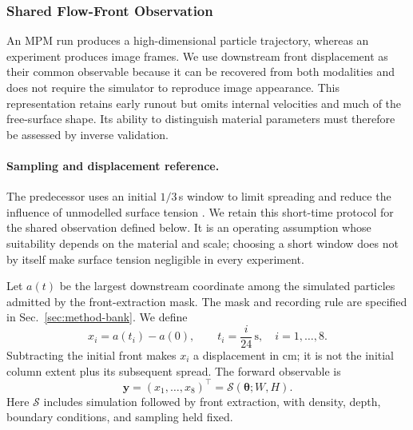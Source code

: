 \subsubsection{Shared Flow-Front Observation}
\label{sec:shared-observation}

An MPM run produces a high-dimensional particle trajectory, whereas an
experiment produces image frames. We use downstream front displacement
as their common observable because it can be recovered from both
modalities and does not require the simulator to reproduce image
appearance. This representation retains early runout but omits internal
velocities and much of the free-surface shape. Its ability to distinguish
material parameters must therefore be assessed by inverse validation.

\paragraph{Sampling and displacement reference.}
The predecessor uses an initial $1/3$\,s window to limit spreading
and reduce the influence of unmodelled surface tension
\cite[Sec.~7.2]{hamamichi2023nonnewtonian}. We retain this short-time
protocol for the shared observation defined below. It is an operating
assumption whose suitability depends on
the material and scale; choosing a short window does not by itself
make surface tension negligible in every experiment.

Let $a(t)$ be the largest downstream coordinate among the simulated
particles admitted by the front-extraction mask. The mask and recording
rule are specified in Sec.~\ref{sec:method-bank}. We define
\begin{equation}
\label{eq:front-displacement}
    x_i=a(t_i)-a(0),\qquad
    t_i=\frac{i}{24}\,\mathrm{s},\quad i=1,\ldots,8.
\end{equation}
Subtracting the initial front makes $x_i$ a displacement in cm; it is
not the initial column extent plus its subsequent spread. The forward
observable is
\begin{equation}
\label{eq:y-def}
    \mathbf y=(x_1,\ldots,x_8)^\top
    =\mathcal S(\boldsymbol\theta;W,H).
\end{equation}
Here $\mathcal S$ includes simulation followed by front extraction,
with density, depth, boundary conditions, and sampling held fixed.

